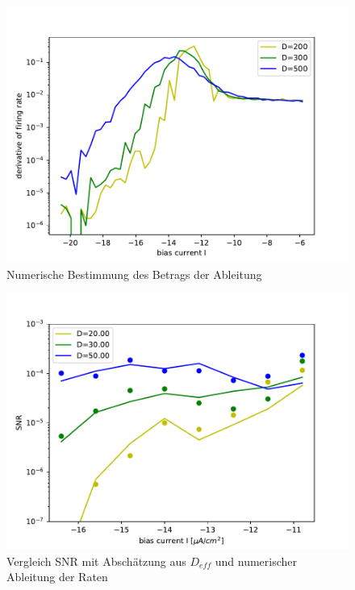 \documentclass[12pt,a4paper]{article}
\begin{document}
\begin{figure}[H]
	\centering
	\includegraphics[scale=1]{drdirinzellong.pdf}\caption{Numerische Bestimmung des Betrags der Ableitung}
	\label{firatenoisederiv}
\end{figure}
\begin{figure}[H]
	\centering
	\includegraphics[scale=1]{snrangerealrinzelcomp.pdf}\caption{Vergleich SNR mit Abschätzung aus $D_{eff}$ und numerischer Ableitung der Raten}
	\label{snrinzelcomp2}
\end{figure}
\end{document}
